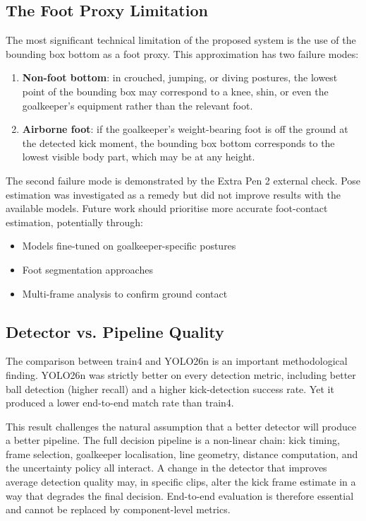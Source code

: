 \documentclass[12pt,a4paper,twoside]{article}
\begin{document}
\subsection{The Foot Proxy Limitation}

The most significant technical limitation of the proposed system is the use of
the bounding box bottom as a foot proxy. This approximation has two failure modes:

\begin{enumerate}
  \item \textbf{Non-foot bottom}: in crouched, jumping, or diving postures,
        the lowest point of the bounding box may correspond to a knee, shin,
        or even the goalkeeper's equipment rather than the relevant foot.
  \item \textbf{Airborne foot}: if the goalkeeper's weight-bearing foot is off
        the ground at the detected kick moment, the bounding box bottom
        corresponds to the lowest visible body part, which may be at any height.
\end{enumerate}

The second failure mode is demonstrated by the Extra Pen 2 external check.
Pose estimation was investigated as a remedy but did not improve results with
the available models. Future work should prioritise more accurate foot-contact
estimation, potentially through:
\begin{itemize}
  \item Models fine-tuned on goalkeeper-specific postures
  \item Foot segmentation approaches
  \item Multi-frame analysis to confirm ground contact
\end{itemize}

\subsection{Detector vs. Pipeline Quality}

The comparison between train4 and YOLO26n is an important methodological
finding. YOLO26n was strictly better on every detection metric, including
better ball detection (higher recall) and a higher kick-detection success rate.
Yet it produced a lower end-to-end match rate than train4.

This result challenges the natural assumption that a better detector will produce
a better pipeline. The full decision pipeline is a non-linear chain: kick timing,
frame selection, goalkeeper localisation, line geometry, distance computation,
and the uncertainty policy all interact. A change in the detector that improves
average detection quality may, in specific clips, alter the kick frame estimate
in a way that degrades the final decision. End-to-end evaluation is therefore
essential and cannot be replaced by component-level metrics.
\end{document}
